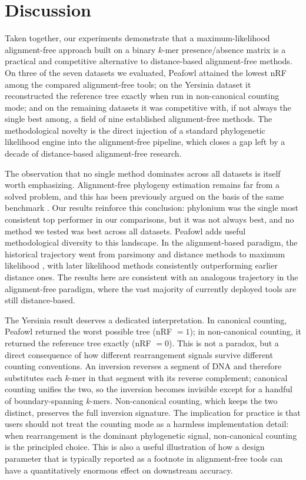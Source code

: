 \documentclass[11pt]{article}
\begin{document}
\section{Discussion}

Taken together, our experiments demonstrate that a maximum-likelihood
alignment-free approach built on a binary $k$-mer presence/absence matrix
is a practical and competitive alternative to distance-based alignment-free
methods. On three of the seven datasets we evaluated, Peafowl attained the
lowest nRF among the compared alignment-free tools; on the Yersinia dataset
it reconstructed the reference tree exactly when run in non-canonical
counting mode; and on the remaining datasets it was competitive with, if
not always the single best among, a field of nine established alignment-free
methods. The methodological novelty is the direct injection of a standard
phylogenetic likelihood engine \citep{stamatakis2014raxml} into the
alignment-free pipeline, which closes a gap left by a decade of
distance-based alignment-free research.

The observation that no single method dominates across all datasets is
itself worth emphasizing. Alignment-free phylogeny estimation remains far
from a solved problem, and this has been previously argued on the basis of
the same benchmark \citep{zielezinski2019afproject}. Our results reinforce
this conclusion: phylonium was the single most consistent top performer in
our comparisons, but it was not always best, and no method we tested was
best across all datasets. Peafowl adds useful methodological diversity to
this landscape. In the alignment-based paradigm, the historical trajectory
went from parsimony \citep{fitch1971parsimony} and distance methods
\citep{saitou1987nj} to maximum likelihood
\citep{felsenstein1981ml, posada2021felsenstein}, with later likelihood
methods consistently outperforming earlier distance ones. The results here
are consistent with an analogous trajectory in the alignment-free paradigm,
where the vast majority of currently deployed tools are still distance-based.

The Yersinia result deserves a dedicated interpretation. In canonical
counting, Peafowl returned the worst possible tree (nRF $= 1$); in
non-canonical counting, it returned the reference tree exactly (nRF $= 0$).
This is not a paradox, but a direct consequence of how different
rearrangement signals survive different counting conventions. An inversion
reverses a segment of DNA and therefore substitutes each $k$-mer in that
segment with its reverse complement; canonical counting unifies the two,
so the inversion becomes invisible except for a handful of boundary-spanning
$k$-mers. Non-canonical counting, which keeps the two distinct, preserves
the full inversion signature. The implication for practice is that users
should not treat the counting mode as a harmless implementation detail:
when rearrangement is the dominant phylogenetic signal, non-canonical
counting is the principled choice. This is also a useful illustration of
how a design parameter that is typically reported as a footnote in
alignment-free tools can have a quantitatively enormous effect on
downstream accuracy.
\end{document}
